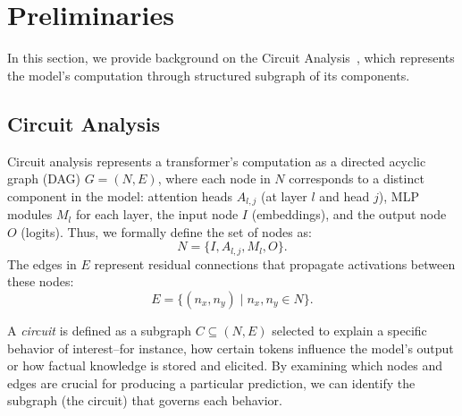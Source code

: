\section{Preliminaries}
\label{sec:preliminaries}
In this section, we provide background on the Circuit Analysis~\citep{zoom, circuitgrokking, conmy2023towards}, which represents the model's computation through structured subgraph of its components. 

\subsection{Circuit Analysis}
\label{subsec:circuit-analysis}
Circuit analysis represents a transformer's computation as a directed acyclic graph (DAG) $G = (N, E)$, where each node in $N$ corresponds to a distinct component in the model: attention heads $A_{l,j}$ (at layer $l$ and head $j$), MLP modules $M_l$ for each layer, the input node $I$ (embeddings), and the output node $O$ (logits). 
Thus, we formally define the set of nodes as:
\begin{equation}
    N = \{ I, A_{l,j}, M_l, O \}.
\end{equation}
The edges in $E$ represent residual connections that propagate activations between these nodes:
\begin{equation}
    E = \{ (n_x, n_y) \mid n_x, n_y \in N \}.
\end{equation}

A \emph{circuit} is defined as a subgraph $C \subseteq (N, E)$ selected to explain a specific behavior of interest--for instance, how certain tokens influence the model's output or how factual knowledge is stored and elicited.  
By examining which nodes and edges are crucial for producing a particular prediction, we can identify the subgraph (the circuit) that governs each behavior.


